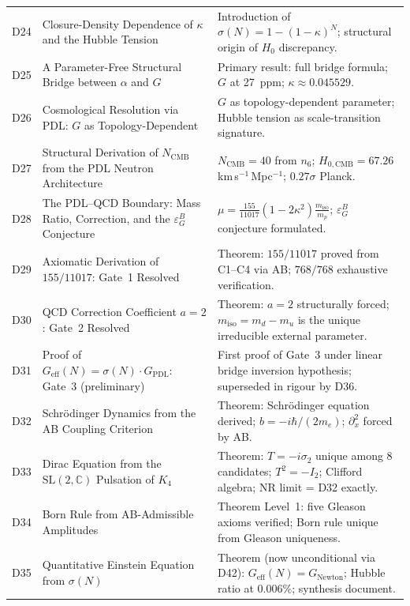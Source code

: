 \documentclass[11pt,a4paper]{article}
\theoremstyle{plain}
\theoremstyle{definition}
\theoremstyle{remark}
\newcommand{\Geff}{G_{\mathrm{eff}}}
\newcommand{\GPDL}{G_{\mathrm{PDL}}}
\newcommand{\sigmaN}{\sigma(N)}
\newcommand{\epsGeomB}{\varepsilon_G^B}
\begin{document}
\begin{longtable}{L{1.3cm}L{3.8cm}L{8.0cm}}
D24 & Closure-Density Dependence of $\kappa$ and the Hubble Tension~\cite{D24} & Introduction of $\sigma(N)=1-(1-\kappa)^N$; structural origin of $H_0$ discrepancy.\\[0.3em]
D25 & A Parameter-Free Structural Bridge between $\alpha$ and $G$~\cite{D25} & \textcolor{proofblue}{Primary result}: full bridge formula; $G$ at 27~ppm; $\kappa\approx 0.045529$.\\[0.3em]
D26 & Cosmological Resolution via PDL: $G$ as Topology-Dependent~\cite{D26} & $G$ as topology-dependent parameter; Hubble tension as scale-transition signature.\\[0.3em]
D27 & Structural Derivation of $N_{\mathrm{CMB}}$ from the PDL Neutron Architecture~\cite{D27} & $N_{\mathrm{CMB}}=40$ from $n_6$; $H_{0,\mathrm{CMB}}=67.26$ km\,s$^{-1}$\,Mpc$^{-1}$; $0.27\sigma$ Planck.\\[0.3em]
D28 & The PDL--QCD Boundary: Mass Ratio, Correction, and the $\epsGeomB$ Conjecture~\cite{D28} & $\mu = \frac{155}{11017}(1-2\kappa^2)\frac{m_{\mathrm{iso}}}{m_p}$; $\epsGeomB$ conjecture formulated.\\[0.3em]
D29 & Axiomatic Derivation of $155/11017$: Gate~1 Resolved~\cite{D29} & \textcolor{proofblue}{Theorem}: $155/11017$ proved from C1--C4 via AB; $768/768$ exhaustive verification.\\[0.3em]
D30 & QCD Correction Coefficient $a=2$: Gate~2 Resolved~\cite{D30} & \textcolor{proofblue}{Theorem}: $a=2$ structurally forced; $m_{\mathrm{iso}}=m_d-m_u$ is the unique irreducible external parameter.\\[0.3em]
D31 & Proof of $\Geff(N)=\sigmaN\cdot\GPDL$: Gate~3 (preliminary)~\cite{D31} & First proof of Gate~3 under linear bridge inversion hypothesis; superseded in rigour by D36.\\[0.3em]
D32 & Schr\"odinger Dynamics from the AB Coupling Criterion~\cite{D32} & \textcolor{proofblue}{Theorem}: Schr\"odinger equation derived; $b=-i\hbar/(2m_e)$; $\partial_x^2$ forced by AB.\\[0.3em]
D33 & Dirac Equation from the $\mathrm{SL}(2,\mathbb{C})$ Pulsation of $K_4$~\cite{D33} & \textcolor{proofblue}{Theorem}: $T=-i\sigma_2$ unique among 8 candidates; $T^2=-I_2$; Clifford algebra; NR limit = D32 exactly.\\[0.3em]
D34 & Born Rule from AB-Admissible Amplitudes~\cite{D34} & \textcolor{proofblue}{Theorem} Level~1: five Gleason axioms verified; Born rule unique from Gleason uniqueness.\\[0.3em]
D35 & Quantitative Einstein Equation from $\sigmaN$~\cite{D35} & \textcolor{proofblue}{Theorem} (now unconditional via D42): $G_{\mathrm{eff}}(N)=G_{\mathrm{Newton}}$; Hubble ratio at $0.006\%$; synthesis document.\\[0.3em]

\end{longtable}
\end{document}
